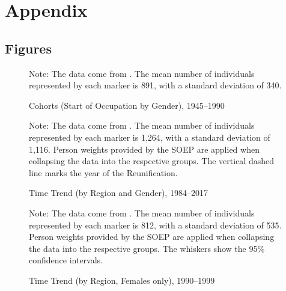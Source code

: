 \documentclass[a4paper, oneside, hyperfootnotes = false]{article}
\begin{document}
{\fontsize{11pt}{16.5pt}\selectfont

{}
\section*{Appendix}
\label{appendix}

{}
\subsection*{Figures}
\label{figures}

\begin{figure}[ht]
    \centering
    \caption{Cohorts (Start of Occupation by Gender), 1945--1990}
    \label{fig:mayer}
    \fontsize{9pt}{11pt}\selectfont
	\def\svgwidth{\textwidth}
	
    \vspace{2mm}
    \parbox{10cm}{
    \linespread{1}\footnotesize Note: The data come from \cite{Mayer1995}. The mean number of individuals represented by each marker is 891, with a standard deviation of 340.}
\end{figure}

\begin{figure}[ht]
	\centering
	\caption{Time Trend (by Region and Gender), 1984--2017}
	\label{fig:timetrend}
	\fontsize{9pt}{11pt}\selectfont
	\def\svgwidth{\textwidth}
	
	\vspace{2mm}
	\parbox{10cm}{
	\linespread{1}\footnotesize Note: The data come from \cite{SOEP2023}. The mean number of individuals represented by each marker is 1,264, with a standard deviation of 1,116. Person weights provided by the SOEP are applied when collapsing the data into the respective groups. The vertical dashed line marks the year of the Reunification.}
\end{figure}

\begin{figure}[ht]
	\centering
	\caption{Time Trend (by Region, Females only), 1990--1999}
	\label{fig:timetrendzoom}
	\fontsize{9pt}{11pt}\selectfont
	\def\svgwidth{\textwidth}
	
	\vspace{2mm}
	\parbox{10cm}{
	\linespread{1}\footnotesize Note: The data come from \cite{SOEP2023}. The mean number of individuals represented by each marker is 812, with a standard deviation of 535. Person weights provided by the SOEP are applied when collapsing the data into the respective groups. The whiskers show the 95\% confidence intervals.}
\end{figure}

}
\end{document}

